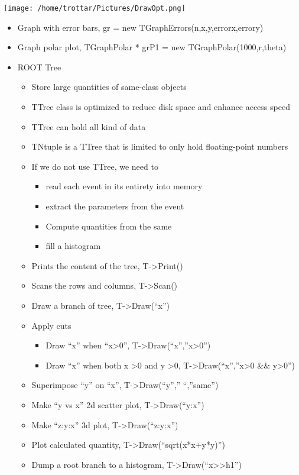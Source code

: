 \documentclass[11pt]{article}
\begin{document}
\begin{center}
\texttt{[image: /home/trottar/Pictures/DrawOpt.png]}
\end{center}
\begin{itemize}
\item Graph with error bars, gr = new TGraphErrors(n,x,y,errorx,errory)
\item Graph polar plot,  TGraphPolar * grP1 = new TGraphPolar(1000,r,theta)
\item ROOT Tree
\begin{itemize}
\item Store large quantities of same-class objects
\item TTree class is optimized to reduce disk space and enhance access speed
\item TTree can hold all kind of data
\item TNtuple is a TTree that is limited to only hold floating-point numbers
\item If we do not use TTree, we need to
\begin{itemize}
\item read each event in its entirety into memory
\item extract the parameters from the event
\item Compute quantities from the same
\item fill a histogram
\end{itemize}
\item Prints the content of the tree, T->Print()
\item Scans the rows and columns, T->Scan()
\item Draw a branch of tree, T->Draw(“x”)
\item Apply cuts
\begin{itemize}
\item Draw “x” when “x>0”, T->Draw(“x”,”x>0”)
\item Draw “x” when both x >0 and y >0, T->Draw(“x”,”x>0 \&\& y>0”)
\end{itemize}
\item Superimpose “y” on “x”, T->Draw(“y”,” “,”same”)
\item Make “y vs x” 2d scatter plot, T->Draw(“y:x”)
\item Make “z:y:x” 3d plot, T->Draw(“z:y:x”)
\item Plot calculated quantity, T->Draw(“sqrt(x*x+y*y)”)
\item Dump a root branch to a histogram, T->Draw(“x>>h1”)
\end{itemize}

\end{itemize}
\end{document}
